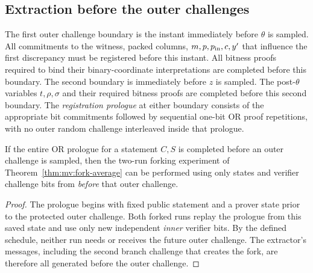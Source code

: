 \subsection{Extraction before the outer challenges}\label{sec:mv:temporal}

\begin{definition}\label{def:mv:boundary}
The first outer challenge boundary is the instant
immediately before $\theta$ is sampled.
All commitments to the witness, packed columns,
$m,p,p_{\rm in},c,y'$ that influence the first
discrepancy must be registered before this instant.
All bitness proofs required to bind their
binary-coordinate interpretations are completed
before this boundary.
The second boundary is immediately before $z$
is sampled. The post-$\theta$ variables
$t,\rho,\sigma$ and their required bitness proofs
are completed before this second boundary.
The \emph{registration prologue} at either boundary
consists of the appropriate bit commitments
followed by sequential one-bit OR proof repetitions,
with no outer random challenge interleaved
inside that prologue.
\end{definition}

\begin{lemma}\label{lem:mv:temporal-local}
If the entire OR prologue for a statement
$C,S$ is completed before an outer challenge
is sampled, then the two-run forking experiment
of Theorem~\ref{thm:mv:fork-average} can be
performed using only states and verifier
challenge bits from \emph{before} that
outer challenge.
\end{lemma}
\begin{proof}
The prologue begins with fixed public
statement and a prover state prior to
the protected outer challenge.
Both forked runs replay the prologue
from this saved state and use only
new independent \emph{inner} verifier bits.
By the defined schedule, neither run
needs or receives the future outer
challenge. The extractor's messages,
including the second branch challenge
that creates the fork, are therefore
all generated before the outer challenge.
\end{proof}

